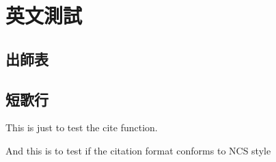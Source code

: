 
\chapter{英文測試}

\begin{tempsection}

\section{出師表}

\lipsum

\section{短歌行}

\lipsum

This is just to test \cite{Krasnogor2004e} the cite function.
 
And this is to test if the citation format conforms to NCS style \cite{zhangDistributedAdaptiveFiniteTime2021}
\end{tempsection}